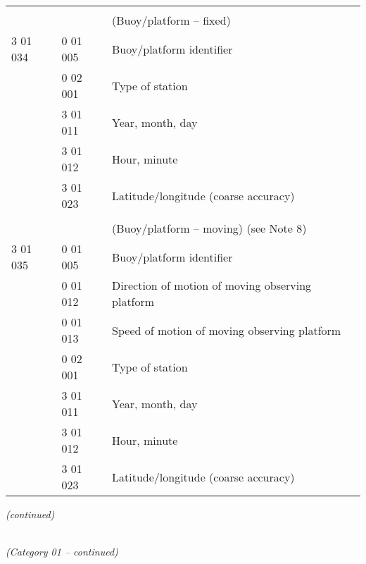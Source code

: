 \begin{longtable}[]{@{}llll@{}}
& & &\tabularnewline
& & (Buoy/platform -- fixed) &\tabularnewline
3 01 034 & 0 01 005 & Buoy/platform identifier &\tabularnewline
& 0 02 001 & Type of station &\tabularnewline
& 3 01 011 & Year, month, day &\tabularnewline
& 3 01 012 & Hour, minute &\tabularnewline
& 3 01 023 & Latitude/longitude (coarse accuracy) &\tabularnewline
& & &\tabularnewline
& & (Buoy/platform -- moving) (see Note 8) &\tabularnewline
3 01 035 & 0 01 005 & Buoy/platform identifier &\tabularnewline
& 0 01 012 & Direction of motion of moving observing platform &\tabularnewline
& 0 01 013 & Speed of motion of moving observing platform &\tabularnewline
& 0 02 001 & Type of station &\tabularnewline
& 3 01 011 & Year, month, day &\tabularnewline
& 3 01 012 & Hour, minute &\tabularnewline
& 3 01 023 & Latitude/longitude (coarse accuracy) &\tabularnewline
\bottomrule
\end{longtable}

\emph{(continued)}

\emph{\\
(Category 01 -- continued)}

